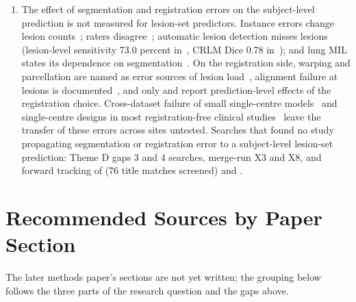 \documentclass[journal,onecolumn]{IEEEtran}
\begin{document}
\begin{enumerate}
\item{} The effect of segmentation and registration errors on the subject-level prediction is not measured for lesion-set predictors. Instance errors change lesion counts~\cite{Wynen2025ConfLUNet}; raters disagree~\cite{Menze2015Multimodal}; automatic lesion detection misses lesions (lesion-level sensitivity 73.0 percent in~\cite{Kendrick2022Fully}, CRLM Dice 0.78 in~\cite{Alberb2026Automated}); and lung MIL states its dependence on segmentation~\cite{Chen2022LungMIL}. On the registration side, warping and parcellation are named as error sources of lesion load~\cite{Seghier2023Elusive}, alignment failure at lesions is documented~\cite{Brett2001Spatial,Miller2025Comparison,Mok2022Unsupervised}, and only \cite{Choi2026Tumor} and \cite{Dong2024Self} report prediction-level effects of the registration choice. Cross-dataset failure of small single-centre models~\cite{Bonkhoff2024Prediction} and single-centre designs in most registration-free clinical studies~\cite{Gong2026Robust,Chen2021AMINN,Sabouri2025Enhancing,Liu2026Three} leave the transfer of these errors across sites untested. Searches that found no study propagating segmentation or registration error to a subject-level lesion-set prediction: Theme D gaps 3 and 4 searches, merge-run X3 and X8, and forward tracking of \cite{Bowren2022Poststroke} (76 title matches screened) and \cite{Chen2021AMINN}.

\end{enumerate}

\section{Recommended Sources by Paper Section}

The later methods paper's sections are not yet written; the grouping below follows the three parts of the research question and the gaps above.
\end{document}
